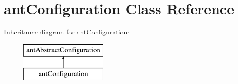 \hypertarget{classant_configuration}{\section{ant\+Configuration Class Reference}
\label{classant_configuration}
}
Inheritance diagram for ant\+Configuration\+:\begin{figure}[H]
\begin{center}
\leavevmode
\includegraphics[height=2.000000cm]{classant_configuration}
\end{center}
\end{figure}
